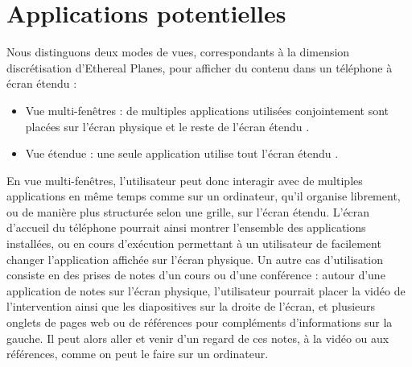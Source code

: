 \section{Applications potentielles}
\label{sec:concept_applications}

Nous distinguons deux modes de vues, correspondants à la dimension discrétisation d'Ethereal Planes, pour afficher du contenu dans un téléphone à écran étendu :
\begin{itemize}
  \item Vue multi-fenêtres : de multiples applications utilisées conjointement sont placées sur l'écran physique et le reste de l'écran étendu .
  \item Vue étendue : une seule application utilise tout l'écran étendu .
\end{itemize}
\medskip


En vue multi-fenêtres, l'utilisateur peut donc interagir avec de multiples applications en même temps comme sur un ordinateur, qu'il organise librement, ou de manière plus structurée selon une grille, sur l'écran étendu. L'écran d'accueil du téléphone pourrait ainsi montrer l'ensemble des applications installées, ou en cours d'exécution  permettant à un utilisateur de facilement changer l'application affichée sur l'écran physique. Un autre cas d'utilisation consiste en des prises de notes d'un cours ou d'une conférence : autour d'une application de notes sur l'écran physique, l'utilisateur pourrait placer la vidéo de l'intervention ainsi que les diapositives sur la droite de l'écran, et plusieurs onglets de pages web ou de références pour compléments d'informations sur la gauche. Il peut alors aller et venir d'un regard de ces notes, à la vidéo ou aux références, comme on peut le faire sur un ordinateur.

